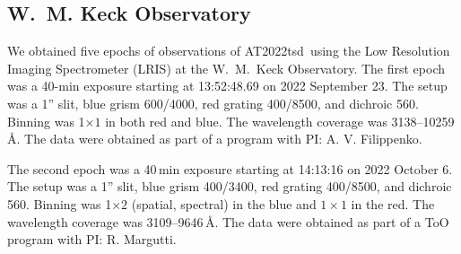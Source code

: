 \documentclass{nature_plusfigure}
\newcommand{\at}{AT2022tsd}
\begin{document}
\begin{methods}




\subsection{W.~M. Keck Observatory}
\label{sec:Keck}

We obtained five epochs of observations of \at\ using the Low Resolution Imaging Spectrometer (LRIS) at the W.~M.~Keck Observatory. The first epoch was a 40-min exposure starting at 13:52:48.69 on 2022 September 23. The setup was a 1'' slit, blue grism 600/4000, red grating 400/8500, and dichroic 560. Binning was 1$\times1$ in both red and blue. The wavelength coverage was 3138--10259\,\AA. The data were obtained as part of a program with PI: A. V. Filippenko.

The second epoch was a 40\,min exposure starting at 14:13:16 on 2022 October 6. The setup was a 1'' slit, blue grism 400/3400, red grating 400/8500, and dichroic 560. Binning was 1$\times2$ (spatial, spectral) in the blue and $1\times1$ in the red. The wavelength coverage was 3109--9646\,\AA. The data were obtained as part of a ToO program with PI: R. Margutti. 


\end{methods}
\end{document}
